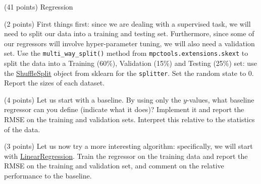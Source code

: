 \documentclass[12pt]{article}
\begin{document}
\begin{question}{\label{Q_LR_BA}(41 points) Regression}





\begin{subquestion}{(2 points) First things first: since we are dealing with a supervised task, we will need to split our data into a training and testing set. Furthermore, since some of our regressors will involve hyper-parameter tuning, we will also need a validation set. Use the \texttt{multi\_way\_split()} method from \texttt{mpctools.extensions.skext} to split the data into a Training (60\%), Validation (15\%) and Testing (25\%) set: use the \href{https://scikit-learn.org/stable/modules/generated/sklearn.model_selection.ShuffleSplit.html}{ShuffleSplit} object from sklearn for the \texttt{splitter}. Set the random state to 0.  Report the sizes of each dataset.}






\end{subquestion}

\begin{subquestion}{(4 points) Let us start with a baseline. By using only the $y$-values, what baseline regressor can you define (indicate what it does)? Implement it and report the RMSE on the training and validation sets. Interpret this relative to the statistics of the data.}






\end{subquestion}

\begin{subquestion}{(3 points) Let us now try a more interesting algorithm: specifically, we will start with \href{https://scikit-learn.org/stable/modules/generated/sklearn.linear_model.LinearRegression.html}{LinearRegression}. Train the regressor on the training data and report the RMSE on the training and validation set, and comment on the relative performance to the baseline.}




\end{subquestion}
\end{question}
\end{document}
